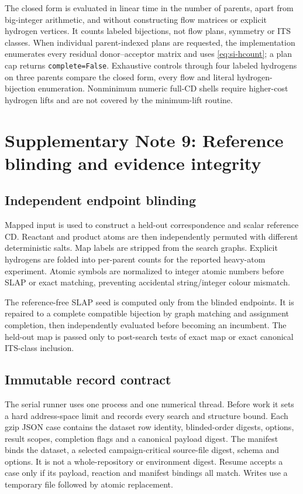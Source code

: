 \documentclass[11pt]{article}
\theoremstyle{definition}
\begin{document}
The closed form is evaluated in linear time in the number of parents, apart
from big-integer arithmetic, and without constructing flow matrices or
explicit hydrogen vertices.  It counts labeled bijections, not flow plans,
symmetry or ITS classes.  When individual parent-indexed plans are requested,
the implementation enumerates every residual donor--acceptor matrix and uses
\cref{eq:si-hcount}; a plan cap returns \texttt{complete=False}.  Exhaustive
controls through four labeled hydrogens on three parents compare the closed
form, every flow and literal hydrogen-bijection enumeration.  Nonminimum
numeric full-CD shells require higher-cost hydrogen lifts and are not covered
by the minimum-lift routine.

\section{Supplementary Note 9: Reference blinding and evidence integrity}

\subsection{Independent endpoint blinding}

Mapped input is used to construct a held-out correspondence and scalar
reference CD.  Reactant and product atoms are then independently permuted with
different deterministic salts.  Map labels are stripped from the search
graphs.  Explicit hydrogens are folded into per-parent counts for the reported
heavy-atom experiment.  Atomic symbols are normalized to integer atomic
numbers before SLAP or exact matching, preventing accidental string/integer
colour mismatch.

The reference-free SLAP seed is computed only from the blinded endpoints.  It
is repaired to a complete compatible bijection by graph matching and
assignment completion, then independently evaluated before becoming an
incumbent.  The held-out map is passed only to post-search tests of exact map
or exact canonical ITS-class inclusion.

\subsection{Immutable record contract}

The serial runner uses one process and one numerical thread.  Before work it
sets a hard address-space limit and records every search and structure bound.
Each gzip JSON case contains the dataset row identity, blinded-order digests,
options, result scopes, completion flags and a canonical payload digest.  The
manifest binds the dataset, a selected campaign-critical source-file digest,
schema and options.  It is not a whole-repository or environment digest.  Resume
accepts a case only if its payload, reaction and manifest bindings all match.
Writes use a temporary file followed by atomic replacement.
\end{document}
